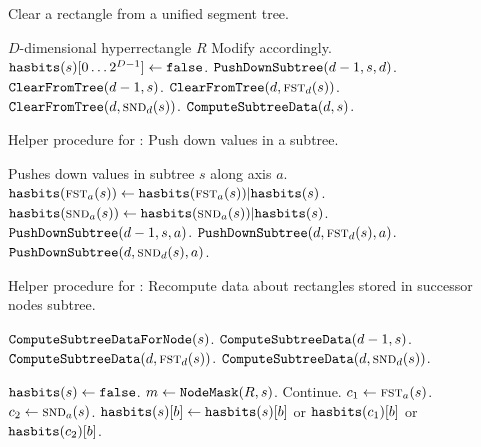 \documentclass[english,gradu]{tktltiki2018}
\begin{document}
\begin{algorithm}
\caption{Clear a rectangle from a unified segment tree.}\label{alg:segurm}
\begin{algorithmic}
\Require $D$-dimensional hyperrectangle $R$
\Ensure Modify \hasbits{}{} accordingly.
		\State \Return
	\EndIf
		\State $\texttt{hasbits}(s)[0\dots 2^{D-1}]\gets\texttt{false}$.
		\State \Return
	\EndIf
		\State $\texttt{PushDownSubtree}(d-1,s,d)$.
	\EndIf
	\State $\texttt{ClearFromTree}(d-1,s)$.
		\State $\texttt{ClearFromTree}(d,\textsc{fst}_{d}(s))$.
		\State $\texttt{ClearFromTree}(d,\textsc{snd}_{d}(s))$.
	\EndIf
		\State $\texttt{ComputeSubtreeData}(d,s)$.
	\EndIf
\EndProcedure
\end{algorithmic}
\end{algorithm}

\begin{algorithm}
\caption{Helper procedure for \cleardt: Push down values in a subtree.}\label{alg:segurm:pdst}
\begin{algorithmic}
	\Comment Pushes down values in subtree $s$ along axis $a$.
		\State $\texttt{hasbits}(\textsc{fst}_{a}(s))\gets \texttt{hasbits}(\textsc{fst}_{a}(s)) | \texttt{hasbits}(s)$.
		\State $\texttt{hasbits}(\textsc{snd}_{a}(s))\gets \texttt{hasbits}(\textsc{snd}_{a}(s)) | \texttt{hasbits}(s)$.
		\State \Return
		\State \Return
	\EndIf
	\State $\texttt{PushDownSubtree}(d-1,s,a)$.
		\State $\texttt{PushDownSubtree}(d,\textsc{fst}_{d}(s),a)$.
		\State $\texttt{PushDownSubtree}(d,\textsc{snd}_{d}(s),a)$.
	\EndIf
\EndProcedure
\end{algorithmic}
\end{algorithm}

\begin{algorithm}
\begin{algorithmic}
\caption{Helper procedure for \cleardt: Recompute data about rectangles stored in successor nodes subtree.}\label{alg:segurm:recomp}
		\State $\texttt{ComputeSubtreeDataForNode}(s)$.
		\State \Return
		\State \Return
	\EndIf
	\State $\texttt{ComputeSubtreeData}(d-1,s)$.
		\State $\texttt{ComputeSubtreeData}(d,\textsc{fst}_{d}(s))$.
		\State $\texttt{ComputeSubtreeData}(d,\textsc{snd}_{d}(s))$.
	\EndIf
\EndProcedure

	\State $\texttt{hasbits}(s)\gets\texttt{false}$.
	\State $m\gets\texttt{NodeMask}(R,s)$.
			\State Continue.
		\EndIf
		\State $c_1\gets\textsc{fst}_{a}(s)$.
		\State $c_2\gets\textsc{snd}_{a}(s)$.
				\State $\texttt{hasbits}(s)[b]\gets \texttt{hasbits}(s)[b]$ or $\texttt{hasbits}(c_1)[b]$ or $\texttt{hasbits}(c_2)[b]$.
			\EndIf
		\EndFor
	\EndFor
\EndProcedure
\end{algorithmic}
\end{algorithm}
\end{document}
